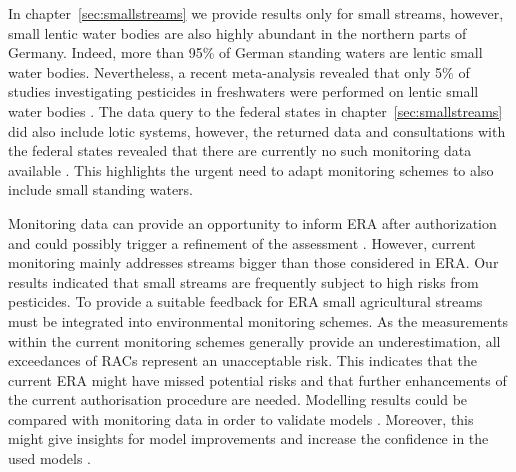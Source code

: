 In chapter~\ref{sec:smallstreams} we provide results only for small streams, however, small lentic water bodies are also highly abundant in the northern parts of Germany.
Indeed, more than 95\% of German standing waters are lentic small water bodies.
Nevertheless, a recent meta-analysis revealed that only 5\% of studies investigating pesticides in freshwaters were performed on lentic small water bodies \citep{lorenz_specifics_2016}.
The data query to the federal states in chapter~\ref{sec:smallstreams} did also include lotic systems, however, the returned data and consultations with the federal states revealed that there are currently no such monitoring data available \citep{brinke_umsetzung_2016}. 
This highlights the urgent need to adapt monitoring schemes to also include small standing waters.

Monitoring data can provide an opportunity to inform ERA after authorization and could possibly trigger a refinement of the assessment \citep{knauer_pesticides_2016}. 
However, current monitoring mainly addresses streams bigger than those considered in ERA.
Our results indicated that small streams are frequently subject to high risks from pesticides.
To provide a suitable feedback for ERA small agricultural streams must be integrated into environmental monitoring schemes. 
As the measurements within the current monitoring schemes generally provide an underestimation, all exceedances of RACs represent an unacceptable risk.
This indicates that the current ERA might have missed potential risks and that further enhancements of the current authorisation procedure are needed.
Modelling results could be compared with monitoring data in order to validate models \citep{knabel_fungicide_2014}.
Moreover, this might give insights for model improvements and increase the confidence in the used models \citep{gitzen_design_2012}.

